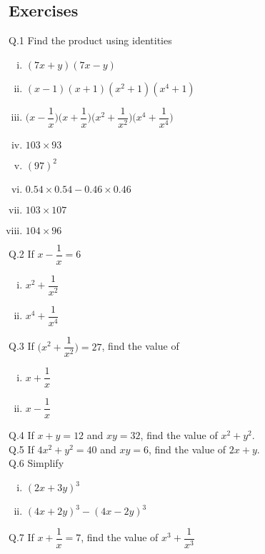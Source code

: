 \subsection{Exercises}
Q.1 Find the product using identities
\begin{multicols}{2}
\begin{enumerate}[(i)]
\item $(7x+y)(7x-y)$
\item $(x-1)(x+1)(x^2+1)(x^4+1)$
\item $\Big(x-\dfrac{1}{x}\Big)\Big(x+\dfrac{1}{x}\Big)\Big(x^2+\dfrac{1}{x^2}\Big)\Big(x^4+\dfrac{1}{x^4}\Big)$
\item $103\times93$
\item $(97)^2$
\item $0.54\times0.54 - 0.46\times0.46$
\item $103\times107$
\item $104\times96$
\end{enumerate}
\end{multicols}
\noindent Q.2 If $x-\dfrac{1}{x} = 6$
\begin{multicols}{2}
\begin{enumerate}[(i)]
\item $x^2+\dfrac{1}{x^2}$
\item $x^4+\dfrac{1}{x^4}$
\end{enumerate}
\end{multicols}
\noindent Q.3 If $\Big(x^2+\dfrac{1}{x^2}\Big) = 27$, find the value of
\begin{multicols}{2}
\begin{enumerate}[(i)]
\item $x+\dfrac{1}{x}$
\item $x-\dfrac{1}{x}$
\end{enumerate}
\end{multicols}
\noindent Q.4 If $x+y = 12$ and $xy = 32$, find the value of $x^2+y^2$.\\
Q.5 If $4x^2+y^2 = 40$ and $xy = 6$, find the value of $2x+y$.\\
Q.6 Simplify
\begin{multicols}{2}
\begin{enumerate}[(i)]
\item $(2x+3y)^3$
\item $(4x+2y)^3-(4x-2y)^3$
\end{enumerate}
\end{multicols}
\noindent Q.7 If $x+\dfrac{1}{x} = 7$, find the value of $x^3+\dfrac{1}{x^3}$\\
